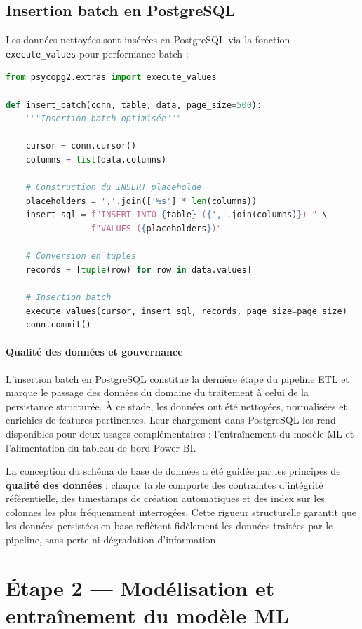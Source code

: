 \documentclass[a4paper,12pt]{report}
\begin{document}
\subsection{Insertion batch en PostgreSQL}

Les données nettoyées sont insérées en PostgreSQL via la fonction \texttt{execute\_values} pour performance batch :

\begin{lstlisting}[language=Python]
from psycopg2.extras import execute_values

def insert_batch(conn, table, data, page_size=500):
    """Insertion batch optimisée"""
    
    cursor = conn.cursor()
    columns = list(data.columns)
    
    # Construction du INSERT placeholde
    placeholders = ','.join(['%s'] * len(columns))
    insert_sql = f"INSERT INTO {table} ({','.join(columns)}) " \
                 f"VALUES ({placeholders})"
    
    # Conversion en tuples
    records = [tuple(row) for row in data.values]
    
    # Insertion batch
    execute_values(cursor, insert_sql, records, page_size=page_size)
    conn.commit()
\end{lstlisting}


\paragraph{Qualité des données et gouvernance}

L'insertion batch en PostgreSQL constitue la dernière étape du pipeline ETL et marque le passage des données du domaine du traitement à celui de la persistance structurée. À ce stade, les données ont été nettoyées, normalisées et enrichies de features pertinentes. Leur chargement dans PostgreSQL les rend disponibles pour deux usages complémentaires : l'entraînement du modèle ML et l'alimentation du tableau de bord Power BI.

La conception du schéma de base de données a été guidée par les principes de \textbf{qualité des données} : chaque table comporte des contraintes d'intégrité référentielle, des timestamps de création automatiques et des index sur les colonnes les plus fréquemment interrogées. Cette rigueur structurelle garantit que les données persistées en base reflètent fidèlement les données traitées par le pipeline, sans perte ni dégradation d'information.

\section{Étape 2 — Modélisation et entraînement du modèle ML}
\end{document}
